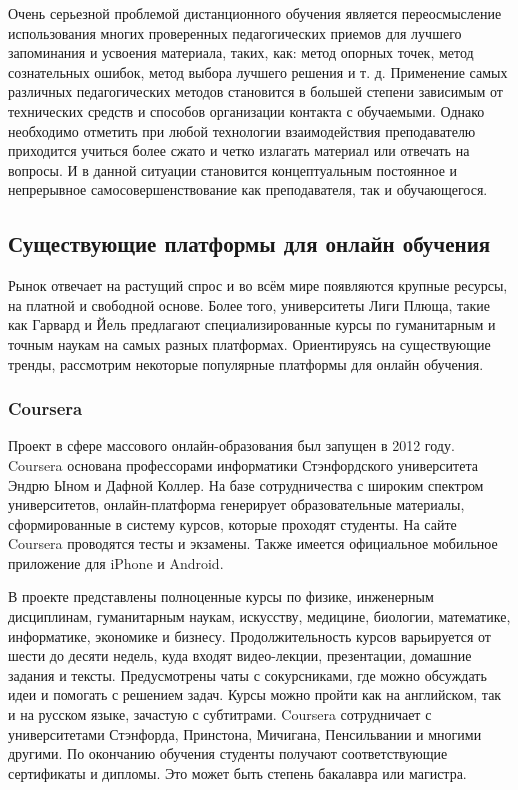 Очень серьезной проблемой дистанционного обучения является переосмысление использования многих
проверенных педагогических приемов для лучшего запоминания и усвоения материала,
таких, как: метод опорных точек, метод сознательных ошибок, метод выбора лучшего
решения и т. д. Применение самых различных педагогических методов становится в большей
степени зависимым от технических средств и способов организации контакта с обучаемыми.
Однако необходимо отметить при любой технологии взаимодействия преподавателю приходится
учиться более сжато и четко излагать материал или отвечать на вопросы. И в данной ситуации
становится концептуальным постоянное и непрерывное самосовершенствование как преподавателя,
так и обучающегося.

\subsection{Существующие платформы для онлайн обучения}

Рынок отвечает на растущий спрос и во всём мире появляются крупные ресурсы, на платной и
свободной основе. Более того, университеты Лиги Плюща, такие как Гарвард и Йель предлагают
специализированные курсы по гуманитарным и точным наукам на самых разных платформах. Ориентируясь
на существующие тренды, рассмотрим некоторые популярные платформы для онлайн обучения.

\subsubsection{Coursera}

Проект в сфере массового онлайн-образования был запущен в 2012 году. Coursera основана
профессорами информатики Стэнфордского университета Эндрю Ыном и Дафной Коллер.
На базе сотрудничества с широким спектром университетов, онлайн-платформа генерирует
образовательные материалы, сформированные в систему курсов, которые проходят студенты.
На сайте Coursera проводятся тесты и экзамены. Также имеется официальное мобильное
приложение для iPhone и Android.\cite{the-steppe}

В проекте представлены полноценные курсы по физике, инженерным дисциплинам, гуманитарным наукам,
искусству, медицине, биологии, математике, информатике, экономике и бизнесу.
Продолжительность курсов варьируется от шести до десяти недель, куда входят видео-лекции,
презентации, домашние задания и тексты. Предусмотрены чаты с сокурсниками, где можно обсуждать
идеи и помогать с решением задач. Курсы можно пройти как на английском, так и на русском языке,
зачастую с субтитрами. Coursera сотрудничает с университетами Стэнфорда, Принстона, Мичигана,
Пенсильвании и многими другими. По окончанию обучения студенты получают соответствующие
сертификаты и дипломы. Это может быть степень бакалавра или магистра.


